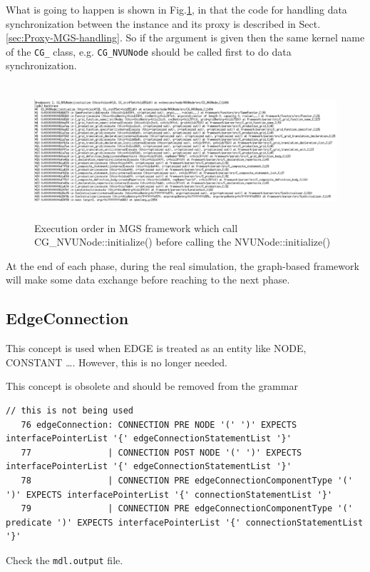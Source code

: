 What is going to happen is shown in Fig.\ref{fig:MGS_execution_order}, in that
the code for handling data synchronization between the instance and its proxy is
described in Sect.\ref{sec:Proxy-MGS-handling}. So if the argument is given then
the same kernel name of the \verb!CG_! class, e.g. \verb!CG_NVUNode! should be
called first to do data synchronization.

\begin{figure}[hbt]
  \centerline{\includegraphics[height=5cm,
    angle=0]{./images/MGS_execution_order.eps}}
\caption{Execution order in MGS framework which call
CG\_NVUNode::initialize() before calling the NVUNode::initialize()}
\label{fig:MGS_execution_order}
\end{figure}


At the end of each phase, during the real simulation, the graph-based framework
will make some data exchange before reaching to the next phase.


\subsection{EdgeConnection}
\label{sec:MDL-EdgeConnection}

This concept is used when EDGE is treated as an entity like NODE, CONSTANT
\ldots. However, this is no longer needed.

This concept is obsolete and should be removed from the grammar
\begin{verbatim}
// this is not being used
   76 edgeConnection: CONNECTION PRE NODE '(' ')' EXPECTS interfacePointerList '{' edgeConnectionStatementList '}'
   77               | CONNECTION POST NODE '(' ')' EXPECTS interfacePointerList '{' edgeConnectionStatementList '}'
   78               | CONNECTION PRE edgeConnectionComponentType '(' ')' EXPECTS interfacePointerList '{' connectionStatementList '}'
   79               | CONNECTION PRE edgeConnectionComponentType '(' predicate ')' EXPECTS interfacePointerList '{' connectionStatementList '}'

\end{verbatim}
Check the \verb!mdl.output! file.

